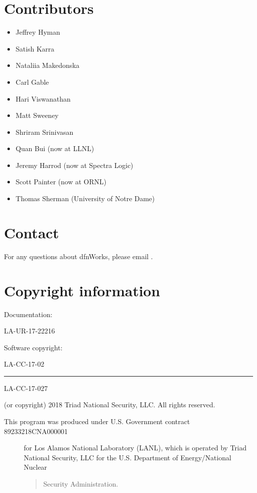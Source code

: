 \documentclass[letterpaper,10pt,english]{sphinxmanual}
\begin{document}
\section{Contributors}
\label{\detokenize{intro:contributors}}\begin{itemize}
\item {} 
Jeffrey Hyman

\item {} 
Satish Karra

\item {} 
Nataliia Makedonska

\item {} 
Carl Gable

\item {} 
Hari Viswanathan

\item {} 
Matt Sweeney

\item {} 
Shriram Srinivasan

\item {} 
Quan Bui (now at LLNL)

\item {} 
Jeremy Harrod (now at Spectra Logic)

\item {} 
Scott Painter (now at ORNL)

\item {} 
Thomas Sherman (University of Notre Dame)

\end{itemize}


\section{Contact}
\label{\detokenize{intro:contact}}
For any questions about dfnWorks, please email .


\section{Copyright information}
\label{\detokenize{intro:copyright-information}}
Documentation:

LA-UR-17-22216

Software copyright:

LA-CC-17-02


\bigskip\hrule\bigskip


LA-CC-17-027

(or copyright) 2018 Triad National Security, LLC. All rights reserved.
\begin{description}
\item[{This program was produced under U.S. Government contract 89233218CNA000001}] \leavevmode
for Los Alamos National Laboratory (LANL), which is operated by Triad
National Security, LLC for the U.S. Department of Energy/National Nuclear
\begin{quote}

Security Administration.
\end{quote}

\end{description}
\end{document}
